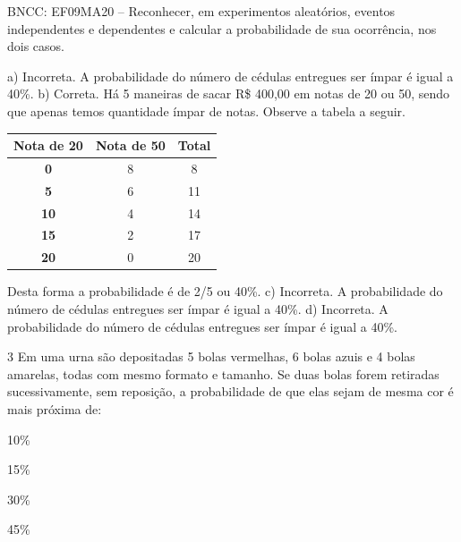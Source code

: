 {{{\begin{escolha}
{{{{{\begin{escolha}
\begin{escolha}
{\begin{q°}
{\begin{enumerate}
{{BNCC: EF09MA20 -- Reconhecer, em experimentos aleatórios, eventos independentes
e dependentes e calcular a probabilidade de sua ocorrência, nos dois casos. 

a) Incorreta. A probabilidade do número de cédulas entregues ser ímpar é igual a 40\%. 
b) Correta. Há 5 maneiras de sacar R\$ 400,00 em notas de 20 ou 50, sendo que apenas temos quantidade ímpar de notas. Observe a tabela a seguir.

\begin{table}[]
\begin{tabular}{|c|c|c|}
\hline
\textbf{Nota de 20} & \textbf{Nota de 50} & \textbf{Total} \\ \hline
\textbf{0} & 8 & 8 \\ \hline
\textbf{5} & 6 & 11 \\ \hline
\textbf{10} & 4 & 14 \\ \hline
\textbf{15} & 2 & 17 \\ \hline
\textbf{20} & 0 & 20 \\ \hline
\end{tabular}
\end{table}

Desta forma a probabilidade é de 2/5 ou 40\%.
c) Incorreta. A probabilidade do número de cédulas entregues ser ímpar é igual a 40\%. 
d) Incorreta. A probabilidade do número de cédulas entregues ser ímpar é igual a 40\%.}

\num{3} Em uma urna são depositadas 5 bolas vermelhas, 6 bolas azuis e 4 bolas
amarelas, todas com mesmo formato e tamanho. Se duas bolas forem
retiradas sucessivamente, sem reposição, a probabilidade de que elas
sejam de mesma cor é mais próxima de:

\begin{escolha}

  \item 10\%

  \item 15\%

  \item 30\%

  \item 45\%

\end{escolha}

}
\end{enumerate}}
\end{q°}}
\end{escolha}
\end{escolha}}}}}}
\end{escolha}}}}
